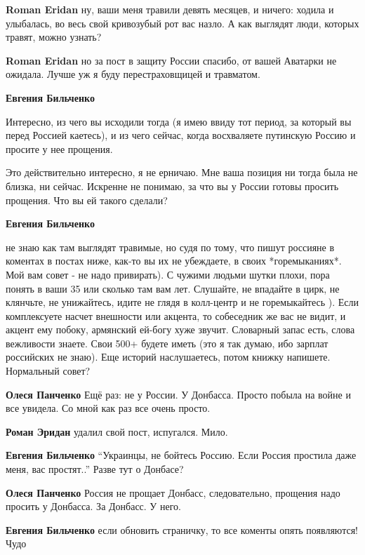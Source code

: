 \begin{itemize}
\begin{itemize}
\textbf{Roman Eridan} ну, ваши меня травили девять месяцев, и ничего: ходила и улыбалась, во весь свой кривозубый рот вас назло. А как выглядят люди, которых травят, можно узнать?


\textbf{Roman Eridan} но за пост в защиту России спасибо, от вашей Аватарки не ожидала. Лучше уж я буду перестраховщицей и травматом.

\textbf{Евгения Бильченко} 

Интересно, из чего вы исходили тогда (я имею ввиду тот период, за который вы
перед Россией каетесь), и из чего сейчас, когда восхваляете путинскую Россию и
просите у нее прощения.

Это действительно интересно, я не ерничаю.
Мне ваша позиция ни тогда была не близка, ни сейчас.
Искренне не понимаю, за что вы у России готовы просить прощения.
Что вы ей такого сделали?

\textbf{Евгения Бильченко} 

не знаю как там выглядят травимые, но судя по тому, что пишут россияне в
коментах в постах ниже, как-то вы их не убеждаете, в своих *горемыканиях*. Мой
вам совет - не надо привирать). С чужими людьми шутки плохи, пора понять в ваши
35 или сколько там вам лет. Слушайте, не впадайте в цирк, не клянчьте, не
унижайтесь, идите не глядя в колл-центр и не горемыкайтесь ). Если комплексуете
насчет внешности или акцента, то собеседник же вас не видит, и акцент ему
побоку, армянский ей-богу хуже звучит. Словарный запас есть, слова вежливости
знаете. Свои 500+ будете иметь (это я так думаю, ибо зарплат российских не
знаю). Еще историй наслушаетесь, потом книжку напишете. Нормальный совет?

\textbf{Олеся Панченко} Ещё раз: не у России. У Донбасса. Просто побыла на войне и все увидела. Со мной как раз все очень просто.

\textbf{Роман Эридан} удалил свой пост, испугался. Мило.

\textbf{Евгения Бильченко} \enquote{Украинцы, не бойтесь Россию. Если Россия простила даже меня, вас простят..}
Разве тут о Донбасе?

\textbf{Олеся Панченко} Россия не прощает Донбасс, следовательно, прощения надо просить у Донбасса. За Донбасс. У него.

\textbf{Евгения Бильченко} если обновить страничку, то все коменты опять появляются! Чудо


\end{itemize}
\end{itemize}
